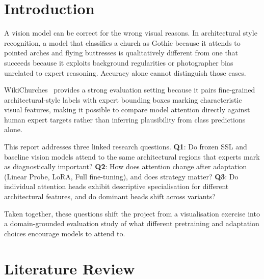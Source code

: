 \documentclass[lineno,pdflatex,sn-mathphys-num]{sn-jnl}%
\theoremstyle{thmstyleone}%
\theoremstyle{thmstyletwo}%
\theoremstyle{thmstylethree}%
\begin{document}



\maketitle

\section{Introduction}

A vision model can be correct for the wrong visual reasons. In architectural
style recognition, a model that classifies a church as Gothic because it attends
to pointed arches and flying buttresses is qualitatively different from one that
succeeds because it exploits background regularities or photographer bias
unrelated to expert reasoning. Accuracy alone cannot distinguish those cases.

WikiChurches~\cite{Barz21WikiChurches} provides a strong evaluation setting
because it pairs fine-grained architectural-style labels with expert bounding
boxes marking characteristic visual features, making it possible to compare
model attention directly against human expert targets rather than inferring
plausibility from class predictions alone.

This report addresses three linked research questions. \textbf{Q1}: Do frozen
SSL and baseline vision models attend to the same architectural regions that
experts mark as diagnostically important? \textbf{Q2}: How does attention change
after adaptation (Linear Probe, LoRA, Full fine-tuning), and does strategy
matter? \textbf{Q3}: Do individual attention heads exhibit descriptive
specialisation for different architectural features, and do dominant heads shift
across variants?

Taken together, these questions shift the project from a visualisation exercise
into a domain-grounded evaluation study of what different pretraining and
adaptation choices encourage models to attend to.

\section{Literature Review}
\label{sec:lit}
\end{document}
